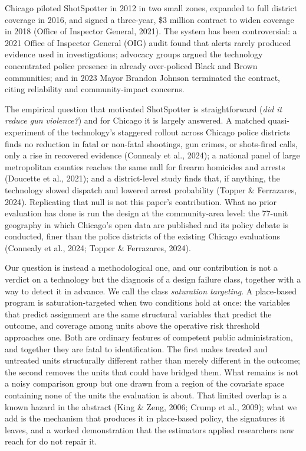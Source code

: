 \documentclass[12pt]{article}
\begin{document}
Chicago piloted ShotSpotter in 2012 in two small zones, expanded to full district
coverage in 2016, and signed a three-year, \$3 million contract to widen coverage in
2018 (Office of Inspector General, 2021). The system has been controversial: a 2021
Office of Inspector General (OIG) audit found that alerts rarely produced evidence used
in investigations; advocacy groups argued the technology concentrated police presence in
already over-policed Black and Brown communities; and in 2023 Mayor Brandon Johnson
terminated the contract, citing reliability and community-impact concerns.

The empirical question that motivated ShotSpotter is straightforward (\emph{did it reduce
gun violence?}) and for Chicago it is largely answered. A matched quasi-experiment of the
technology's staggered rollout across Chicago police districts finds no reduction in fatal
or non-fatal shootings, gun crimes, or shots-fired calls, only a rise in recovered
evidence (Connealy et al., 2024); a national panel of large metropolitan counties reaches
the same null for firearm homicides and arrests (Doucette et al., 2021); and a
district-level study finds that, if anything, the technology slowed dispatch and lowered
arrest probability (Topper \& Ferrazares, 2024). Replicating that null is not this paper's
contribution. What no prior evaluation has done is run the design at the community-area
level: the 77-unit geography in which Chicago's open data are published and its policy
debate is conducted, finer than the police districts of the existing Chicago evaluations
(Connealy et al., 2024; Topper \& Ferrazares, 2024).

Our question is instead a methodological one, and our contribution is not a verdict on a
technology but the diagnosis of a design failure class, together with a way to detect it in
advance. We call the class \emph{saturation targeting}. A place-based program is
saturation-targeted when two conditions hold at once: the variables that predict assignment
are the same structural variables that predict the outcome, and coverage among units above
the operative risk threshold approaches one. Both are ordinary features of competent public
administration, and together they are fatal to identification. The first makes treated and
untreated units structurally different rather than merely different in the outcome; the
second removes the units that could have bridged them. What remains is not a noisy
comparison group but one drawn from a region of the covariate space containing none of the
units the evaluation is about. That limited overlap is a known hazard in the abstract (King
\& Zeng, 2006; Crump et al., 2009); what we add is the mechanism that produces it in
place-based policy, the signatures it leaves, and a worked demonstration that the estimators
applied researchers now reach for do not repair it.
\end{document}
